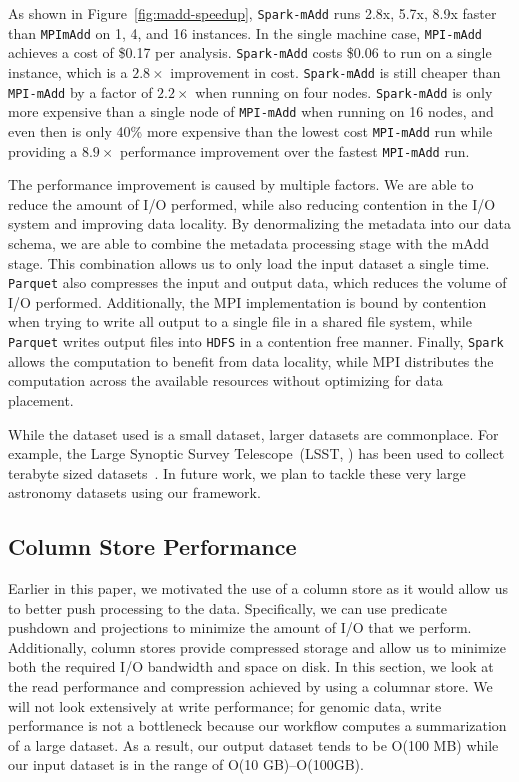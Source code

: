 \documentclass{sig-alternate}
\begin{document}
As shown in Figure~\ref{fig:madd-speedup}, \texttt{Spark-mAdd} runs 2.8x, 5.7x, 8.9x faster than
\texttt{MPImAdd} on 1, 4, and 16 instances. In the single machine case, \texttt{MPI-mAdd} achieves a cost of \$0.17 per
analysis. \texttt{Spark-mAdd} costs \$0.06 to run on a single instance, which is a $2.8\times$ improvement in
cost. \texttt{Spark-mAdd} is still cheaper than \texttt{MPI-mAdd} by a factor of $2.2\times$ when running on four
nodes. \texttt{Spark-mAdd} is only more expensive than a single node of \texttt{MPI-mAdd} when running on 16
nodes, and even then is only 40\% more expensive than the lowest cost \texttt{MPI-mAdd} run while providing a
$8.9\times$ performance improvement over the fastest \texttt{MPI-mAdd} run.

The performance improvement is caused by multiple factors. We are able to reduce the amount of I/O performed,
while also reducing contention in the I/O system and improving data locality. By denormalizing the metadata into
our data schema, we are able to combine the metadata processing stage with the mAdd stage. This combination
allows us to only load the input dataset a single time. \texttt{Parquet} also compresses the input and output data, which
reduces the volume of I/O performed. Additionally, the MPI implementation is bound by contention when trying to write
all output to a single file in a shared file system, while \texttt{Parquet} writes output files into \texttt{HDFS} in a
contention free manner. Finally, \texttt{Spark} allows the computation to benefit from data locality, while MPI distributes
the computation across the available resources without optimizing for data placement.

While the dataset used is a small dataset, larger datasets are commonplace. For example, the Large Synoptic
Survey Telescope~(LSST, \cite{lsst2008}) has been used to collect terabyte sized datasets~\cite{moyers13}. In
future work, we plan to tackle these very large astronomy datasets using our framework.

\subsection{Column Store Performance}
\label{sec:column-store-perf}

Earlier in this paper, we motivated the use of a column store as it would allow us to better push processing to
the data. Specifically, we can use predicate pushdown and projections to minimize the amount of I/O that we
perform. Additionally, column stores provide compressed storage and allow us to minimize both the required
I/O bandwidth and space on disk. In this section, we look at the read performance and compression achieved by
using a columnar store. We will not look extensively at write performance; for genomic
data, write performance is not a bottleneck because our workflow computes a summarization of a large
dataset. As a result, our output dataset tends to be O(100 MB) while our input dataset is in the range of
O(10 GB)--O(100GB).
\end{document}
